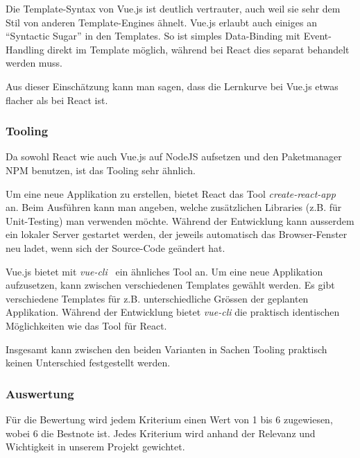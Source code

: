 Die Template-Syntax von Vue.js ist deutlich vertrauter, auch weil sie sehr dem Stil von anderen Template-Engines ähnelt.
Vue.js erlaubt auch einiges an "`Syntactic Sugar"' in den Templates.
So ist simples Data-Binding mit Event-Handling direkt im Template möglich, während bei React dies separat behandelt werden muss.

Aus dieser Einschätzung kann man sagen, dass die Lernkurve bei Vue.js etwas flacher als bei React ist.

\subsubsection{Tooling}
\label{Analyse Framework:Tooling}

Da sowohl React wie auch Vue.js auf NodeJS aufsetzen und den Paketmanager NPM benutzen, ist das Tooling sehr ähnlich.

Um eine neue Applikation zu erstellen, bietet React das Tool \emph{create-react-app}~\cite{create_react_app} an.
Beim Ausführen kann man angeben, welche zusätzlichen Libraries (z.B. für Unit-Testing) man verwenden möchte.
Während der Entwicklung kann ausserdem ein lokaler Server gestartet werden, der jeweils automatisch das Browser-Fenster neu ladet, wenn sich der Source-Code geändert hat.

Vue.js bietet mit \emph{vue-cli}~\cite{vue_cli} ein ähnliches Tool an.
Um eine neue Applikation aufzusetzen, kann zwischen verschiedenen Templates gewählt werden.
Es gibt verschiedene Templates für z.B. unterschiedliche Grössen der geplanten Applikation.
Während der Entwicklung bietet \emph{vue-cli} die praktisch identischen Möglichkeiten wie das Tool für React.

Insgesamt kann zwischen den beiden Varianten in Sachen Tooling praktisch keinen Unterschied festgestellt werden.


\subsubsection{Auswertung}
\label{Analyse Framework:Auswertung}

Für die Bewertung wird jedem Kriterium einen Wert von 1 bis 6 zugewiesen, wobei 6 die Bestnote ist.
Jedes Kriterium wird anhand der Relevanz und Wichtigkeit in unserem Projekt gewichtet.

